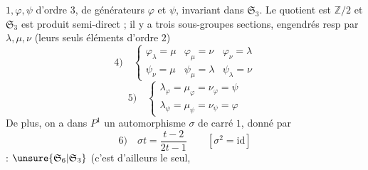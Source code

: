 $1,\varphi,\psi$  d'ordre $3$, de générateurs $\varphi$ et $\psi$, invariant dans $\mathfrak S_3$. Le quotient est $\mathbb Z/2$ et $\mathfrak S_3$ est produit semi-direct ; il y a trois sous-groupes sections, engendrés resp par $\lambda,\mu,\nu$ (leurs seuls éléments d'ordre $2$)
\[
4)\quad\left\{\begin{array}{lll}\varphi_\lambda=\mu&\varphi_\mu=\nu&\varphi_\nu=\lambda\\\psi_\nu=\mu&\psi_\mu=\lambda&\psi_\lambda=\nu\end{array}\right.
\]
\[
5)\quad\left\{\begin{array}{l}\lambda_\varphi=\mu_\varphi=\nu_\varphi=\psi\\\lambda_\psi=\mu_\psi=\nu_\psi=\varphi\end{array}\right.
\]
De plus, on a dans $P^1$ un automorphisme $\sigma$  de carré $1$, donné par
\[
6)\quad\sigma t=\frac{t-2}{2t-1}\qquad[\sigma^2=\mathrm{id}]
\]
 : $\unsure{\mathfrak S_6|\mathfrak S_3}$ (c'est d'ailleurs le seul, 
